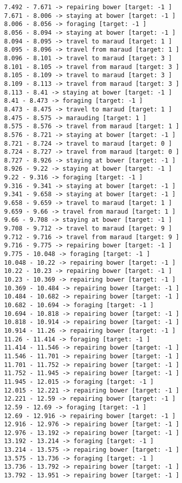 \documentclass[11pt]{article}
\begin{document}
\begin{Verbatim}[commandchars=\\\{\}]
7.492 - 7.671 -> repairing bower [target: -1 ]
7.671 - 8.006 -> staying at bower [target: -1 ]
8.006 - 8.056 -> foraging [target: -1 ]
8.056 - 8.094 -> staying at bower [target: -1 ]
8.094 - 8.095 -> travel to maraud [target: 1 ]
8.095 - 8.096 -> travel from maraud [target: 1 ]
8.096 - 8.101 -> travel to maraud [target: 3 ]
8.101 - 8.105 -> travel from maraud [target: 3 ]
8.105 - 8.109 -> travel to maraud [target: 3 ]
8.109 - 8.113 -> travel from maraud [target: 3 ]
8.113 - 8.41 -> staying at bower [target: -1 ]
8.41 - 8.473 -> foraging [target: -1 ]
8.473 - 8.475 -> travel to maraud [target: 1 ]
8.475 - 8.575 -> marauding [target: 1 ]
8.575 - 8.576 -> travel from maraud [target: 1 ]
8.576 - 8.721 -> staying at bower [target: -1 ]
8.721 - 8.724 -> travel to maraud [target: 0 ]
8.724 - 8.727 -> travel from maraud [target: 0 ]
8.727 - 8.926 -> staying at bower [target: -1 ]
8.926 - 9.22 -> staying at bower [target: -1 ]
9.22 - 9.316 -> foraging [target: -1 ]
9.316 - 9.341 -> staying at bower [target: -1 ]
9.341 - 9.658 -> staying at bower [target: -1 ]
9.658 - 9.659 -> travel to maraud [target: 1 ]
9.659 - 9.66 -> travel from maraud [target: 1 ]
9.66 - 9.708 -> staying at bower [target: -1 ]
9.708 - 9.712 -> travel to maraud [target: 9 ]
9.712 - 9.716 -> travel from maraud [target: 9 ]
9.716 - 9.775 -> repairing bower [target: -1 ]
9.775 - 10.048 -> foraging [target: -1 ]
10.048 - 10.22 -> repairing bower [target: -1 ]
10.22 - 10.23 -> repairing bower [target: -1 ]
10.23 - 10.369 -> repairing bower [target: -1 ]
10.369 - 10.484 -> repairing bower [target: -1 ]
10.484 - 10.682 -> repairing bower [target: -1 ]
10.682 - 10.694 -> foraging [target: -1 ]
10.694 - 10.818 -> repairing bower [target: -1 ]
10.818 - 10.914 -> repairing bower [target: -1 ]
10.914 - 11.26 -> repairing bower [target: -1 ]
11.26 - 11.414 -> foraging [target: -1 ]
11.414 - 11.546 -> repairing bower [target: -1 ]
11.546 - 11.701 -> repairing bower [target: -1 ]
11.701 - 11.752 -> repairing bower [target: -1 ]
11.752 - 11.945 -> repairing bower [target: -1 ]
11.945 - 12.015 -> foraging [target: -1 ]
12.015 - 12.221 -> repairing bower [target: -1 ]
12.221 - 12.59 -> repairing bower [target: -1 ]
12.59 - 12.69 -> foraging [target: -1 ]
12.69 - 12.916 -> repairing bower [target: -1 ]
12.916 - 12.976 -> repairing bower [target: -1 ]
12.976 - 13.192 -> repairing bower [target: -1 ]
13.192 - 13.214 -> foraging [target: -1 ]
13.214 - 13.575 -> repairing bower [target: -1 ]
13.575 - 13.736 -> foraging [target: -1 ]
13.736 - 13.792 -> repairing bower [target: -1 ]
13.792 - 13.951 -> repairing bower [target: -1 ]

\end{Verbatim}
\end{document}
